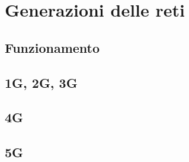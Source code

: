 \section{Generazioni delle reti}
\subsection{Funzionamento}
\subsection{1G, 2G, 3G}
\subsection{4G}
\subsection{5G}